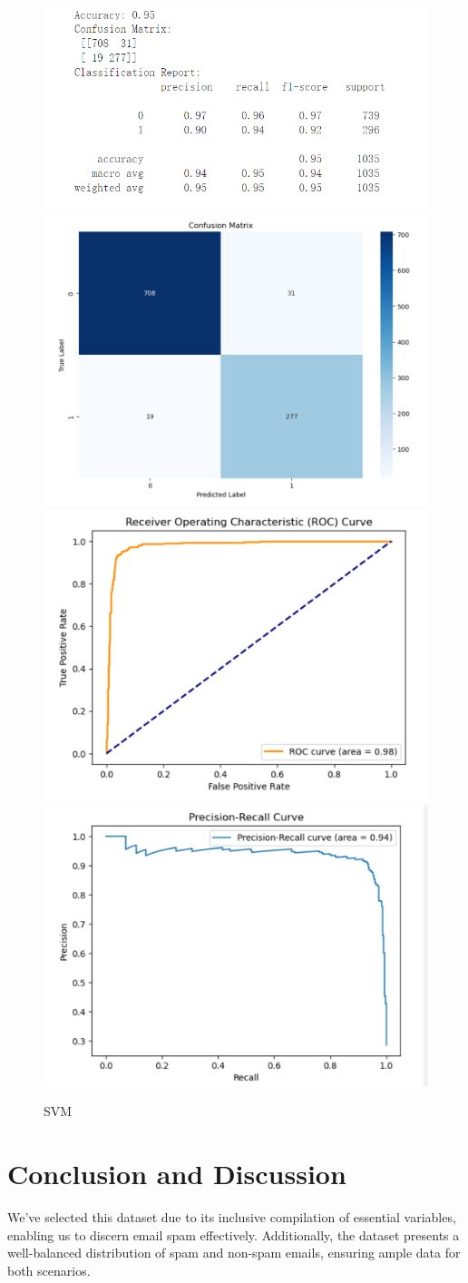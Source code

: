 \documentclass[conference]{IEEEtran}
\begin{document}
\begin{figure}[h]
\centering
    \includegraphics[width=.4\textwidth]{SVM/2-1.png}
    \includegraphics[width=.4\textwidth]{SVM/2-2.png}
    \\[\smallskipamount]
    \includegraphics[width=.4\textwidth]{SVM/2-3.png}
    \includegraphics[width=.4\textwidth]{SVM/2-4.png}
    \caption{SVM}\label{SVM}
\end{figure}

\newpage

\section{\textbf{Conclusion and Discussion}}

We've selected this dataset due to its inclusive compilation of essential variables, enabling us to discern email spam effectively. Additionally, the dataset presents a well-balanced distribution of spam and non-spam emails, ensuring ample data for both scenarios.
\end{document}
